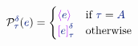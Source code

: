 \[
\prot{\sexp}{\stau}{\sdelta} =
\begin{cases}
  \topaque{\sexp} & \text{if }\stau = \svar{A} \\
  \talien{\sexp}{\stau}{\sdelta} & \text{otherwise}
\end{cases}
\]
